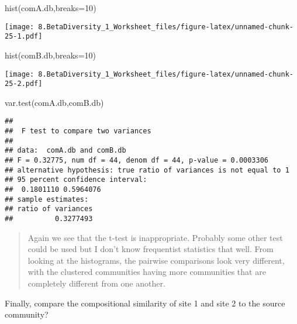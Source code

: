 \documentclass[
]{article}
\newenvironment{Shaded}{\begin{snugshade}}{\end{snugshade}}
\newcommand{\AttributeTok}[1]{\textcolor[rgb]{0.77,0.63,0.00}{#1}}
\newcommand{\DecValTok}[1]{\textcolor[rgb]{0.00,0.00,0.81}{#1}}
\newcommand{\FunctionTok}[1]{\textcolor[rgb]{0.00,0.00,0.00}{#1}}
\newcommand{\NormalTok}[1]{#1}
\newcommand{\OtherTok}[1]{\textcolor[rgb]{0.56,0.35,0.01}{#1}}
\newcommand{\SpecialCharTok}[1]{\textcolor[rgb]{0.00,0.00,0.00}{#1}}
\begin{document}
\begin{Shaded}
\begin{Highlighting}[]
\FunctionTok{hist}\NormalTok{(comA.db,}\AttributeTok{breaks=}\DecValTok{10}\NormalTok{)}
\end{Highlighting}
\end{Shaded}

\texttt{[image: 8.BetaDiversity\_1\_Worksheet\_files/figure-latex/unnamed-chunk-25-1.pdf]}

\begin{Shaded}
\begin{Highlighting}[]
\FunctionTok{hist}\NormalTok{(comB.db,}\AttributeTok{breaks=}\DecValTok{10}\NormalTok{)}
\end{Highlighting}
\end{Shaded}

\texttt{[image: 8.BetaDiversity\_1\_Worksheet\_files/figure-latex/unnamed-chunk-25-2.pdf]}

\begin{Shaded}
\begin{Highlighting}[]
\FunctionTok{var.test}\NormalTok{(comA.db,comB.db)}
\end{Highlighting}
\end{Shaded}

\begin{verbatim}
## 
##  F test to compare two variances
## 
## data:  comA.db and comB.db
## F = 0.32775, num df = 44, denom df = 44, p-value = 0.0003306
## alternative hypothesis: true ratio of variances is not equal to 1
## 95 percent confidence interval:
##  0.1801110 0.5964076
## sample estimates:
## ratio of variances 
##          0.3277493
\end{verbatim}

\begin{quote}
Again we see that the t-test is inappropriate. Probably some other test
could be used but I don't know frequentist statistics that well. From
looking at the histograms, the pairwise comparisons look very different,
with the clustered communities having more communities that are
completely different from one another.
\end{quote}

Finally, compare the compositional similarity of site 1 and site 2 to
the source community?

\begin{Shaded}
\end{Shaded}
\end{document}
